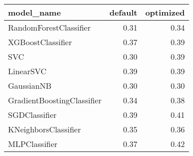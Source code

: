\begin{tabular}{lrr}
\toprule
                model\_name &  default &  optimized \\
\midrule
    RandomForestClassifier &     0.31 &       0.34 \\
         XGBoostClassifier &     0.37 &       0.39 \\
                       SVC &     0.30 &       0.39 \\
                 LinearSVC &     0.39 &       0.39 \\
                GaussianNB &     0.30 &       0.30 \\
GradientBoostingClassifier &     0.34 &       0.38 \\
             SGDClassifier &     0.39 &       0.41 \\
      KNeighborsClassifier &     0.35 &       0.36 \\
             MLPClassifier &     0.37 &       0.42 \\
\bottomrule
\end{tabular}
